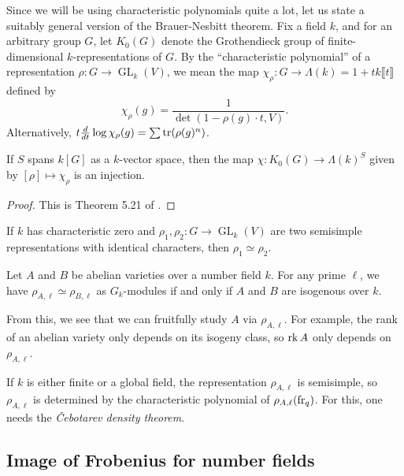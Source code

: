 Since we will be using characteristic polynomials quite a lot, let us state a 
suitably general version of the Brauer-Nesbitt theorem. Fix a field $k$, and 
for an arbitrary group $G$, let $K_0(G)$ denote the Grothendieck group of 
finite-dimensional $k$-representations of $G$. By the ``characteristic 
polynomial'' of a representation $\rho:G \to \operatorname{GL}_k(V)$, we mean 
the map $\chi_\rho:G\to \Lambda(k)=1+t k\llbracket t\rrbracket$ defined by 
\[
  \chi_\rho(g) = \frac{1}{\det(1-\rho(g)\cdot t, V)} \text{.}
\]
Alternatively, $t\frac{d}{dt} \log \chi_\rho(g) = \sum \operatorname{tr}(\rho(g)^n)$. 

\begin{theorem}
If $S$ spans $k[G]$ as a $k$-vector space, then the map 
$\chi:K_0(G) \to \Lambda(k)^S$ given by $[\rho]\mapsto \chi_\rho$ is an 
injection. 
\end{theorem}
\begin{proof}
This is Theorem 5.21 of \cite{eg11}. 
\end{proof}

\begin{corollary}
If $k$ has characteristic zero and 
$\rho_1,\rho_2:G \to \operatorname{GL}_k(V)$ are two semisimple representations 
with identical characters, then $\rho_1\simeq \rho_2$. 
\end{corollary}







\begin{theorem}
Let $A$ and $B$ be abelian varieties over a number field $k$. For any prime 
$\ell$, we have $\rho_{A,\ell}\simeq \rho_{B,\ell}$ as $G_k$-modules if and 
only if $A$ and $B$ are isogenous over $k$. 
\end{theorem}

From this, we see that we can fruitfully study $A$ via $\rho_{A,\ell}$. For 
example, the rank of an abelian variety only depends on its isogeny class, so 
$\operatorname{rk} A$ only depends on $\rho_{A,\ell}$. 

If $k$ is either finite or a global field, the representation $\rho_{A,\ell}$ 
is semisimple, so $\rho_{A,\ell}$ is determined by the characteristic 
polynomial of $\rho_{A,\ell}(\mathrm{fr}_q)$. For this, one needs the 
\emph{\v Cebotarev density theorem}. 





\subsection{Image of Frobenius for number fields}

